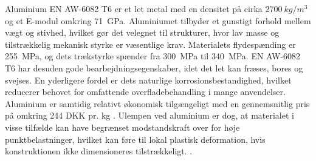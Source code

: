 Aluminium EN AW-6082 T6 er et let metal med en densitet på cirka \(\SI{2700}{kg/m^3}\) og et E-modul omkring \SI{71}{GPa}. Aluminiumet tilbyder et gunstigt forhold mellem vægt og stivhed, hvilket gør det velegnet til strukturer, hvor lav masse og tilstrækkelig mekanisk styrke er væsentlige krav. Materialets flydespænding er \SI{255}{MPa}, og dets trækstyrke spænder fra \SI{300}{MPa} til \SI{340}{MPa}. EN AW-6082 T6 har desuden gode bearbejdningsegenskaber, idet det let kan fræses, bores og svejses. En yderligere fordel er dets naturlige korrosionsbestandighed, hvilket reducerer behovet for omfattende overfladebehandling i mange anvendelser. Aluminium er samtidig relativt økonomisk tilgængeligt med en gennemsnitlig pris på omkring 244 DKK pr. kg \parencite{Aluminiumplade}. Ulempen ved aluminium er dog, at materialet i visse tilfælde kan have begrænset modstandskraft over for høje punktbelastninger, hvilket kan føre til lokal plastisk deformation, hvis konstruktionen ikke dimensioneres tilstrækkeligt. \parencite{Hesse2011AluminiumSheets}.




